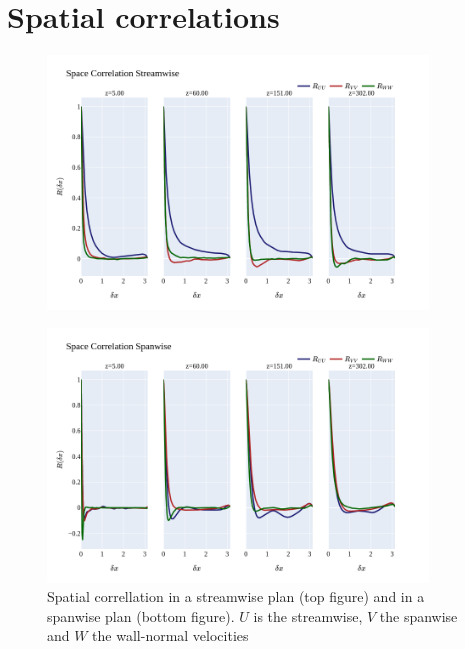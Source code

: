 \documentclass[]{article}
\theoremstyle{plain}
\theoremstyle{remark}
\begin{document}
\section{Spatial correlations}


\begin{figure}[h!]
	\begin{center}
		\includegraphics[width=0.9\textwidth]{../output/split_time/space_correlation/streamwise.png}
	\end{center}
\end{figure}

\begin{figure}[h!]
	\begin{center}
		\includegraphics[width=0.9\textwidth]{../output/split_time/space_correlation/spanwise.png}
		\caption{Spatial correllation in a streamwise plan (top figure) and in a spanwise plan (bottom figure). $U$ is the streamwise, $V$ the spanwise and $W$ the wall-normal velocities}
	\end{center}
\end{figure}
\end{document}
